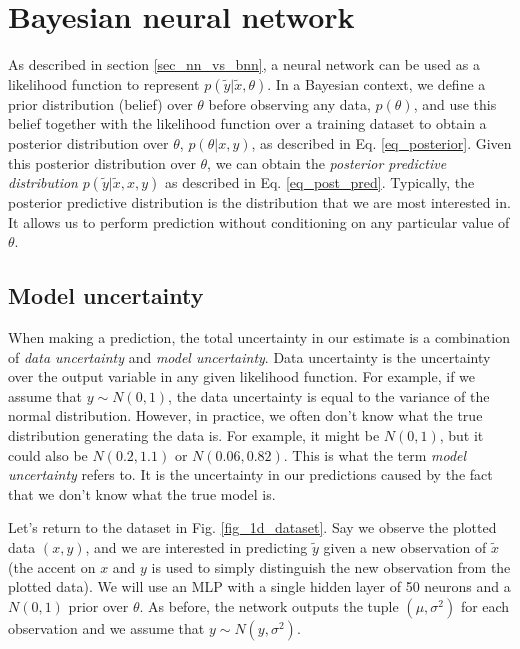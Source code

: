 \documentclass[12pt]{article}
\begin{document}
\section{Bayesian neural network}
\label{sec_bnn}

As described in section \ref{sec_nn_vs_bnn}, a neural network can be used as a likelihood function to represent $p(\tilde{y} | \tilde{x}, \theta)$. In a Bayesian context, we define a prior distribution (belief) over $\theta$ before observing any data, $p(\theta)$, and use this belief together with the likelihood function over a training dataset to obtain a posterior distribution over $\theta$, $p(\theta | x, y)$, as described in Eq. \ref{eq_posterior}. Given this posterior distribution over $\theta$, we can obtain the \textit{posterior predictive distribution} $p(\tilde{y} | \tilde{x}, x, y)$ as described in Eq. \ref{eq_post_pred}. Typically, the posterior predictive distribution is the distribution that we are most interested in. It allows us to perform prediction without conditioning on any particular value of $\theta$.

\subsection{Model uncertainty}
\label{sec_model_uncertain}

When making a prediction, the total uncertainty in our estimate is a combination of \textit{data uncertainty} and \textit{model uncertainty}. Data uncertainty is the uncertainty over the output variable in any given likelihood function. For example, if we assume that $y \sim N(0, 1)$, the data uncertainty is equal to the variance of the normal distribution. However, in practice, we often don't know what the true distribution generating the data is. For example, it might be $N(0, 1)$, but it could also be $N(0.2, 1.1)$ or $N(0.06, 0.82)$. This is what the term \textit{model uncertainty} refers to. It is the uncertainty in our predictions caused by the fact that we don't know what the true model is.

Let's return to the dataset in Fig. \ref{fig_1d_dataset}. Say we observe the plotted data $(x, y)$, and we are interested in predicting $\tilde{y}$ given a new observation of $\tilde{x}$ (the accent on $x$ and $y$ is used to simply distinguish the new observation from the plotted data). We will use an MLP with a single hidden layer of 50 neurons and a $N(0, 1)$ prior over $\theta$. As before, the network outputs the tuple $(\mu, \sigma^2)$ for each observation and we assume that $y \sim N(y, \sigma^2)$.
\end{document}
